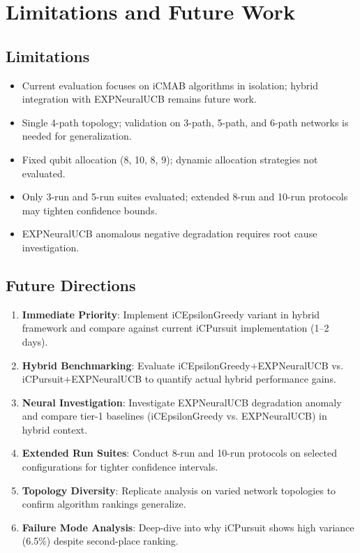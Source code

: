 \documentclass[12pt,a4paper]{article}
\begin{document}
\section{Limitations and Future Work}

\subsection{Limitations}
\begin{itemize}
\item Current evaluation focuses on iCMAB algorithms in isolation; hybrid integration with EXPNeuralUCB remains future work.
\item Single 4-path topology; validation on 3-path, 5-path, and 6-path networks is needed for generalization.
\item Fixed qubit allocation (8, 10, 8, 9); dynamic allocation strategies not evaluated.
\item Only 3-run and 5-run suites evaluated; extended 8-run and 10-run protocols may tighten confidence bounds.
\item EXPNeuralUCB anomalous negative degradation requires root cause investigation.
\end{itemize}

\subsection{Future Directions}
\begin{enumerate}
\item \textbf{Immediate Priority}: Implement iCEpsilonGreedy variant in hybrid framework and compare against current iCPursuit implementation (1--2 days).
\item \textbf{Hybrid Benchmarking}: Evaluate iCEpsilonGreedy+EXPNeuralUCB vs. iCPursuit+EXPNeuralUCB to quantify actual hybrid performance gains.
\item \textbf{Neural Investigation}: Investigate EXPNeuralUCB degradation anomaly and compare tier-1 baselines (iCEpsilonGreedy vs. EXPNeuralUCB) in hybrid context.
\item \textbf{Extended Run Suites}: Conduct 8-run and 10-run protocols on selected configurations for tighter confidence intervals.
\item \textbf{Topology Diversity}: Replicate analysis on varied network topologies to confirm algorithm rankings generalize.
\item \textbf{Failure Mode Analysis}: Deep-dive into why iCPursuit shows high variance (6.5\%) despite second-place ranking.
\end{enumerate}
\end{document}
